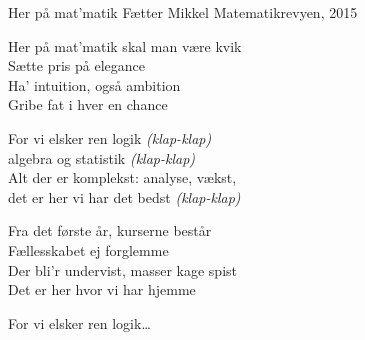 \begin{song}{Her på mat'matik}
  {} %
  {Fætter Mikkel} %
  {} %
  {Matematikrevyen, 2015} %
  {\NotCCLIed} %

  \begin{SBVerse}
    Her på mat'matik skal man være kvik\\
    Sætte pris på elegance\\
    Ha' intuition, også ambition\\
    Gribe fat i hver en chance
  \end{SBVerse}

  \begin{SBChorus}
    For vi elsker ren logik \emph{(klap-klap)}\\
    algebra og statistik \emph{(klap-klap)}\\
    Alt der er komplekst: analyse, vækst,\\
    det er her vi har det bedst \emph{(klap-klap)}
  \end{SBChorus}

  \begin{SBVerse}
    Fra det første år, kurserne består\\
    Fællesskabet ej forglemme\\
    Der bli'r undervist, masser kage spist\\
    Det er her hvor vi har hjemme
  \end{SBVerse}

  \begin{SBChorus}
    For vi elsker ren logik\ldots
  \end{SBChorus}

  \begin{SBSection*}
  \end{SBSection*}
\end{song}